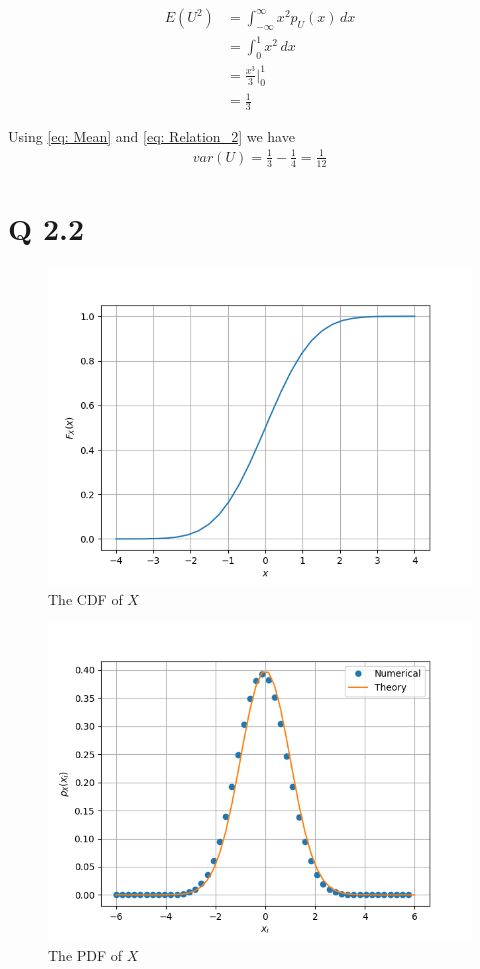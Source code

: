 \documentclass[journal,12pt,twocolumn]{IEEEtran}
\begin{document}
\begin{align}
    	E(U^2) &= \int_{-\infty}^{\infty} x^2 p_U(x) \,dx \\
    	&= \int_{0}^{1} x^2 \,dx \\
    	&= \frac{x^3}{3} \big|^{1}_{0} \\
    	&= \frac{1}{3}
\end{align}

    Using \eqref{eq: Mean} and \eqref{eq: Relation_2} we have
\begin{align}
    	var(U) = \frac{1}{3} - \frac{1}{4} = \frac{1}{12}
\end{align}


\section{Q 2.2}
\begin{figure}[!ht]
\centering
\includegraphics[width=\columnwidth]{./figs/Figure_2.png}
    \caption{The CDF of $X$}
\label{fig:gauss_X}
\end{figure}

\begin{figure}[!ht]
\centering
\includegraphics[width=\columnwidth]{./figs/Figure_3.png}
\caption{The PDF of $X$}
\label{fig:PDF_X}
\end{figure}
\end{document}
